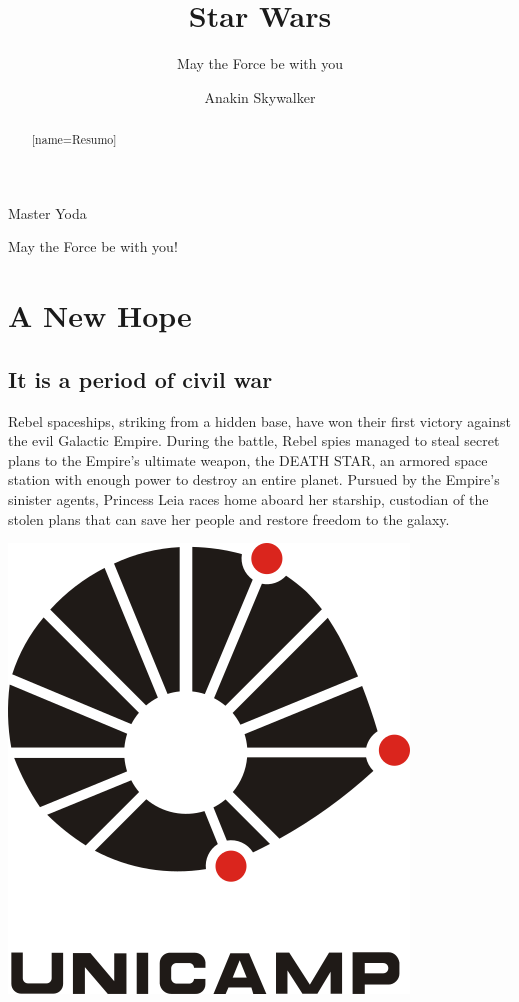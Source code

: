 \documentclass[oneside]{ifgw}
\author{Anakin Skywalker}
\institute[Instituto Darth Plagueis]{Darth Plagueis Institute}
\title[Guerra nas estrelas]{Star Wars}
\subtitle[Que a Força esteja com você]{May the Force be with you}
\begin{document}
\maketitle
\makebackcover
\dedication{To my son, Luke Skywalker.}
\epigraph{Master Yoda}{May the Force be with you!}

\begin{abstract}[name=Resumo]
\lipsum[1]
\end{abstract}

\begin{abstract}
\lipsum[1]
\end{abstract}

\tableofcontents

\chapter{A New Hope}
\section{It is a period of civil war}
Rebel spaceships, striking from a hidden base, have won 
their first victory against the evil Galactic Empire.  
During the battle, Rebel spies managed to steal secret 
plans to the Empire's ultimate weapon, the DEATH STAR, 
an armored space station with enough power to destroy 
an entire planet. Pursued by the Empire's sinister 
agents, Princess Leia races home aboard her starship, 
custodian of the stolen plans that can save her people 
and restore freedom to the galaxy.

\lipsum[1-3]

\begin{center}
\includegraphics[width=.35\textwidth]{Images/unicamp.png}
\end{center}

\lipsum[4-10]
\end{document}
